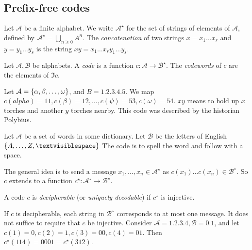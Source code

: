 \subsection{Prefix-free codes}
Let \( \mathcal A \) be a finite alphabet.
We write \( \mathcal A^\star \) for the set of strings of elements of \( \mathcal A \), defined by \( \mathcal A^\star = \bigcup_{n \geq 0} A^n \).
The \emph{concatenation} of two strings \( x = x_1 \dots x_r \) and \( y = y_1 \dots y_s \) is the string \( xy = x_1 \dots x_r y_1 \dots y_s \).
\begin{definition}
    Let \( \mathcal A, \mathcal B \) be alphabets.
    A \emph{code} is a function \( c \colon \mathcal A \to \mathcal B^\star \).
    The \emph{codewords} of \( c \) are the elements of \( \Im c \).
\end{definition}
\begin{example}
    Let \( \mathcal A = \qty{\alpha, \beta, \dots, \omega} \), and \( B = \qty{1, 2, 3, 4, 5} \).
    We map \( c(alpha) = 11, c(\beta) = 12, \dots, c(\psi) = 53, c(\omega) = 54 \).
    \( xy \) means to hold up \( x \) torches and another \( y \) torches nearby.
    This code was described by the historian Polybius.
\end{example}
\begin{example}
    Let \( \mathcal A \) be a set of words in some dictionary.
    Let \( \mathcal B \) be the letters of English \( \qty{A, \dots, Z, \textvisiblespace} \)
    The code is to spell the word and follow with a space.
\end{example}
The general idea is to send a message \( x_1, \dots, x_n \in \mathcal A^\star \) as \( c(x_1) \dots c(x_n) \in \mathcal B^\star \).
So \( c \) extends to a function \( c^\star \colon \mathcal A^\star \to \mathcal B^\star \).
\begin{definition}
    A code \( c \) is \emph{decipherable} (or \emph{uniquely decodable}) if \( c^\star \) is injective.
\end{definition}
If \( c \) is decipherable, each string in \( \mathcal B^\star \) corresponds to at most one message.
It does not suffice to require that \( c \) be injective.
Consider \( \mathcal A = \qty{1, 2, 3, 4}, \mathcal B = \qty{0,1} \), and let \( c(1) = 0, c(2) = 1, c(3) = 00, c(4) = 01 \).
Then \( c^\star(114) = 0001 = c^\star(312) \).


